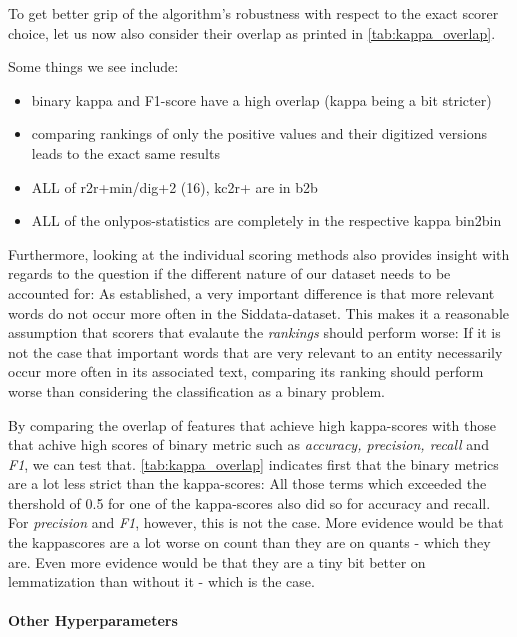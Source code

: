 To get better grip of the algorithm's robustness with respect to the exact scorer choice, let us now also consider their overlap as printed in \autoref{tab:kappa_overlap}. 

Some things we see include:
\begin{itemize}
    \item binary kappa and F1-score have a high overlap (kappa being a bit stricter)
    \item comparing rankings of only the positive values and their digitized versions leads to the exact same results
    \item ALL of r2r+min/dig+2 (16), kc2r+ are in b2b
    \item ALL of the onlypos-statistics are completely in the respective kappa bin2bin
\end{itemize}

Furthermore, looking at the individual scoring methods also provides insight with regards to the question if the different nature of our dataset needs to be accounted for: As established, a very important difference is that more relevant words do not occur more often in the Siddata-dataset. This makes it a reasonable assumption that scorers that evalaute the \textit{rankings} should perform worse: If it is not the case that important words that are very relevant to an entity necessarily occur more often in its associated text, comparing its ranking should perform worse than considering the classification as a binary problem. 

By comparing the overlap of features that achieve high kappa-scores with those that achive high scores of binary metric such as \textit{accuracy, precision, recall} and \textit{F1}, we can test that. \autoref{tab:kappa_overlap} indicates first that the binary metrics are a lot less strict than the kappa-scores: All those terms which exceeded the thershold of 0.5 for one of the kappa-scores also did so for accuracy and recall. For \textit{precision} and \textit{F1}, however, this is not the case. More evidence would be that the kappascores are a lot worse on count than they are on \glspl{quant} - which they are. Even more evidence would be that they are a tiny bit better on lemmatization than without it - which is the case.
 
\paragraph{Other Hyperparameters}

